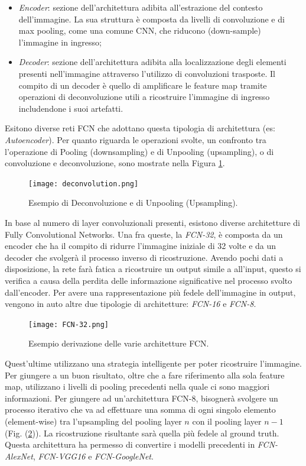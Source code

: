 \begin{itemize}
    \item \emph{Encoder}: sezione dell'architettura adibita all'estrazione del contesto dell'immagine. 
    La sua struttura è composta da livelli di convoluzione e di max 
    pooling, come una comune CNN, che riducono (down-sample) l'immagine 
    in ingresso; 
    \item \emph{Decoder}: sezione dell'architettura adibita alla localizzazione degli elementi 
    presenti nell'immagine attraverso l'utilizzo di convoluzioni trasposte. Il compito 
    di un decoder è quello di amplificare le feature map tramite operazioni 
    di deconvoluzione utili a ricostruire l'immagine di ingresso includendone i 
    suoi artefatti.
\end{itemize}
Esitono diverse reti FCN che adottano questa tipologia di architettura (es: \emph{Autoencoder}). 
Per quanto riguarda le operazioni 
svolte, un confronto tra l'operazione di Pooling (downsampling) e di Unpooling 
(upsampling), o di convoluzione e deconvoluzione, sono mostrate nella 
Figura \ref{deconvolution}.
\begin{figure}
    \centering
    \texttt{[image: deconvolution.png]}
    \centering
    \caption{Esempio di Deconvoluzione e di Unpooling (Upsampling).}
    \label{deconvolution}
\end{figure}
In base al numero di layer convoluzionali presenti, esistono diverse architetture 
di Fully Convolutional Networks. Una fra queste, la \emph{FCN-32}, è composta da 
un encoder che ha il compito di ridurre l'immagine iniziale di 32 volte e da un 
decoder che svolgerà il processo inverso di ricostruzione. Avendo pochi dati a 
disposizione, la rete farà fatica a ricostruire un output simile a all'input, questo si 
verifica a causa della perdita delle informazione significative nel processo svolto 
dall'encoder. Per avere una rappresentazione più fedele dell'immagine in output, 
vengono in auto altre due tipologie di architetture: \emph{FCN-16} e \emph{FCN-8}.
\begin{figure}
    \centering
    \texttt{[image: FCN-32.png]}
    \centering
    \caption{Esempio derivazione delle varie architetture FCN.}
    \label{FCN-models}
\end{figure}
Quest'ultime utilizzano una strategia intelligente per poter ricostruire l'immagine. 
Per giungere a un buon risultato, oltre che a fare riferimento alla sola feature 
map, utilizzano i livelli di pooling precedenti nella quale ci sono maggiori informazioni. 
Per giungere ad un'architettura FCN-8, bisognerà svolgere un processo 
iterativo che va ad effettuare una somma di ogni singolo elemento (element-wise) 
tra l'upsampling del pooling layer $n$ con il pooling layer $n-1$ (Fig. (\ref{FCN-models})). La ricostruzione 
risultante sarà quella più fedele al ground truth. Questa architettura 
ha permesso di convertire i modelli precedenti in \emph{FCN-AlexNet}, \emph{FCN-VGG16} e 
\emph{FCN-GoogleNet}.

